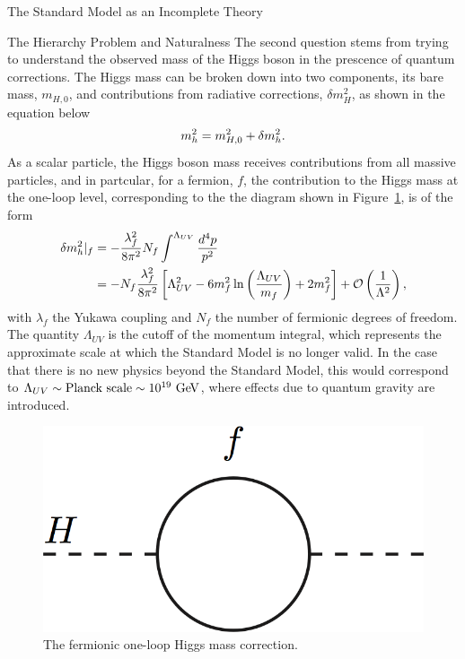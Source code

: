 \begin{section}{The Standard Model as an Incomplete Theory}
\begin{subsection}{The Hierarchy Problem and Naturalness}
The second question stems from trying to understand the observed mass of the Higgs boson in the prescence of quantum corrections.
The Higgs mass can be broken down into two components, its bare mass, $m_{H,0}$, and contributions from radiative corrections, $\delta m_H^2$, as shown in the equation below
\begin{align}
m_{h}^2 = m_{H,0}^2 + \delta m_{h}^2.
\end{align}
As a scalar particle, the Higgs boson mass receives contributions from all massive particles, and in partcular, for a fermion, $f$, the contribution to the Higgs mass at the one-loop level, corresponding to the the diagram shown in Figure~\ref{fig:higgs_fermion_loop}, is of the form
\begin{align}
\delta m_{h}^2|_f &= -\frac{\lambda^2_f}{8\pi^2}N_f \int^{\Lambda_{UV}} \frac{d^4p}{p^2} \nonumber \\
                &= -N_f\frac{\lambda^2_f}{8\pi^2 } \left[\Lambda^2_{UV} - 6m_f^2\ln\left(\frac{\Lambda_{UV}}{m_f}\right) + 2m_f^2\right] + \mathcal{O}\left(\frac{1}{\Lambda^2}\right),
\label{eqn:higgs_fermion_correction}
\end{align}
with $\lambda_f$ the Yukawa coupling and $N_f$ the number of fermionic degrees of freedom.
The quantity $\Lambda_{UV}$ is the cutoff of the momentum integral, which represents the approximate scale at which the Standard Model is no longer valid.
In the case that there is no new physics beyond the Standard Model, this would correspond to $\Lambda_{UV} \sim \text{Planck scale} \sim 10^{19}~\mathrm{Ge\kern -0.1em V}$, where effects due to quantum gravity are introduced.

\begin{figure}[tbp!]
\begin{center}
\includegraphics[angle=0,width=0.40\columnwidth]{fig/higgs_fermion_loop.png}
\end{center}
\caption{The fermionic one-loop Higgs mass correction.}
\label{fig:higgs_fermion_loop}
\end{figure}


\end{subsection}
\end{section}
